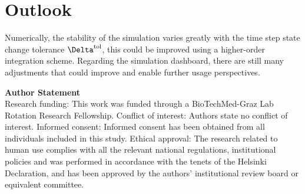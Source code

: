 \documentclass[USenglish,twocolumn]{article}
\begin{document}
  \section{Outlook}
  Numerically, the stability of the simulation varies greatly with the time step state change tolerance $\Delta^{\rm tol}$, this could be improved using a higher-order integration scheme.
  Regarding the simulation dashboard, there are still many adjustments that could improve and enable further usage perspectives.

  \vspace{1cm}


  \textsf{\textbf{Author Statement}}\\
  Research funding: This work was funded through a BioTechMed-Graz Lab Rotation Research Fellowship.
  Conflict of interest: Authors state no conflict of interest.
  Informed consent: Informed consent has been obtained from all individuals included in this study.
  Ethical approval: The research related to human use complies with all the relevant national regulations, institutional policies and was performed in accordance with the tenets of the Helsinki Declaration, and has been approved by the authors' institutional review board or equivalent committee.

  \printbibliography
\end{document}
